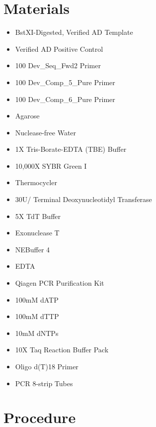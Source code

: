 \documentclass{ssiBio}
\begin{document}
\section{Materials}
\begin{itemize}
  \item{BstXI-Digested, Verified AD Template}
  \item{Verified AD Positive Control}
  \item{100\uM{} Dev\_Seq\_Fwd2 Primer}
  \item{100\uM{} Dev\_Comp\_5\_Pure Primer}
  \item{100\uM{} Dev\_Comp\_6\_Pure Primer}
  \item{Agarose}
  \item{Nuclease-free Water}
  \item{1X Tris-Borate-EDTA (TBE) Buffer}
  \item{10,000X SYBR Green I}
  \item{Thermocycler}
  \item{30U/\uL{} Terminal Deoxynucleotidyl Transferase}
  \item{5X TdT Buffer}
  \item{Exonuclease T}
  \item{NEBuffer 4}
  \item{EDTA}
  \item{Qiagen PCR Purification Kit}
  \item{100mM dATP}
  \item{100mM dTTP}
  \item{10mM dNTPs}
  \item{10X Taq Reaction Buffer Pack}
  \item{Oligo d(T)18 Primer}
  \item{PCR 8-strip Tubes}
\end{itemize}

\section{Procedure}
\end{document}
